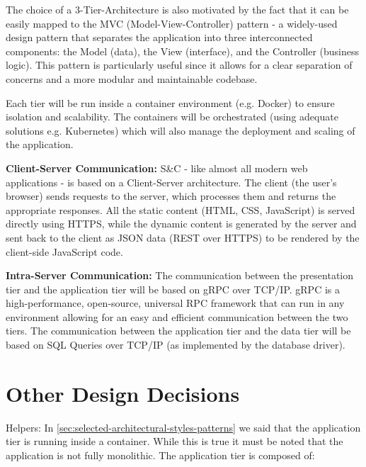 The choice of a 3-Tier-Architecture is also motivated by the fact that it can be easily mapped to the MVC
(Model-View-Controller) pattern - a widely-used design pattern that separates the application into three interconnected
components: the Model (data), the View (interface), and the Controller (business logic). This pattern is particularly
useful since it allows for a clear separation of concerns and a more modular and maintainable codebase.

Each tier will be run inside a container environment (e.g. Docker) to ensure isolation and scalability. The containers
will be orchestrated (using adequate solutions e.g. Kubernetes) which will also manage the deployment and scaling of
the application.

\par{\textbf{Client-Server Communication:}} S\&C - like almost all modern web applications - is based on a
Client-Server architecture. The client (the user's browser) sends requests to the server, which processes them and
returns the appropriate responses. All the static content (HTML, CSS, JavaScript) is served directly using HTTPS, while
the dynamic content is generated by the server and sent back to the client as JSON data (REST over HTTPS) to be
rendered by the client-side JavaScript code.

\par{\textbf{Intra-Server Communication:}} The communication between the presentation tier and the application tier
will be based on gRPC over TCP/IP. gRPC is a high-performance, open-source, universal RPC framework that can run in any
environment allowing for an easy and efficient communication between the two tiers. The communication between the
application tier and the data tier will be based on SQL Queries over TCP/IP (as implemented by the database driver).

\section{Other Design Decisions}
\label{sec:other-design-decisions}%

\par{Helpers:} In \ref{sec:selected-architectural-styles-patterns} we said that the application tier is running inside a
container. While this is true it must be noted that the application is not fully monolithic. The application tier is
composed of:

